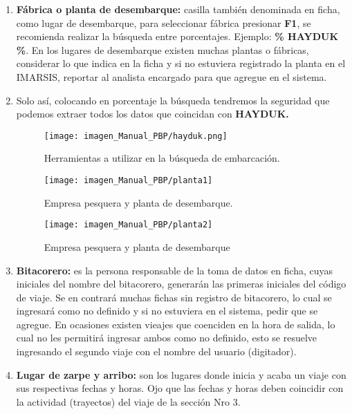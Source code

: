 \documentclass[a4paper,oneside,11pt]{book}
\begin{document}
\begin{enumerate}
 \item \textbf{Fábrica o planta de desembarque:} casilla también denominada en ficha, como lugar de desembarque, para seleccionar fábrica presionar \textbf{ F1}, se recomienda realizar la búsqueda entre porcentajes. Ejemplo:  \textbf{\% HAYDUK \%}.
 En los lugares de desembarque existen muchas plantas o fábricas, considerar lo que indica en la ficha y si no estuviera  registrado la planta en el IMARSIS, reportar al analista encargado para que agregue en el sistema.
  
 \item[] Solo así, colocando en porcentaje la búsqueda tendremos la seguridad que podemos extraer todos los datos que coincidan con \textbf{HAYDUK.}
  \begin{figure} [!h]
  	\begin{center}
  		\texttt{[image: imagen\_Manual\_PBP/hayduk.png]}
  		\caption{Herramientas a utilizar en la búsqueda de embarcación.}
  	\end{center}
  \end{figure}
  \begin{figure} [!h]
  	\begin{center}
  		\texttt{[image: imagen\_Manual\_PBP/planta1]}
  		\caption{Empresa pesquera y planta de desembarque.}
  	\end{center}
  \end{figure}
  
  \begin{figure} [!h]
   	\begin{center}
   		\texttt{[image: imagen\_Manual\_PBP/planta2]}
   		\caption{Empresa pesquera y planta de desembarque}
   	\end{center}
  \end{figure}
\item \textbf{{Bitacorero:}} es la persona responsable de la toma de datos en ficha, cuyas iniciales del nombre del bitacorero, generarán las primeras iniciales del código de viaje. Se en contrará muchas fichas sin registro de bitacorero, lo cual se ingresará como no definido y si no estuviera en el sistema, pedir que se agregue. En ocasiones existen vieajes que coenciden en la hora de salida, lo cual no les permitirá ingresar ambos como no definido, esto se resuelve ingresando el segundo viaje con el nombre del usuario (digitador).

\item \textbf{{Lugar de zarpe y arribo:}} son los lugares donde inicia y acaba un  viaje con sus respectivas fechas y horas. Ojo que las fechas y horas deben coincidir con la actividad (trayectos) del viaje de la sección Nro 3.


\end{enumerate}
\end{document}
